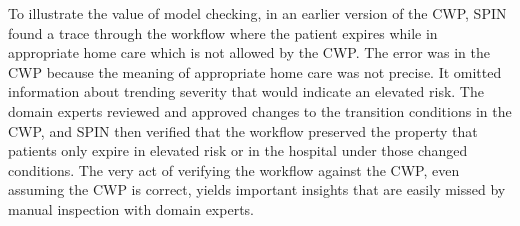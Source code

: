 To illustrate the value of model checking, in an earlier version of the CWP, SPIN found a trace through the workflow where the patient expires while in appropriate home care which is not allowed by the CWP. The error was in the CWP because the meaning of appropriate home care was not precise. It omitted information about trending severity that would indicate an elevated risk. The domain experts reviewed and approved changes to the transition conditions in the CWP, and SPIN then verified that the workflow preserved the property that patients only expire in elevated risk or in the hospital under those changed conditions. The very act of verifying the workflow against the CWP, even assuming the CWP is correct, yields important insights that are easily missed by manual inspection with domain experts.